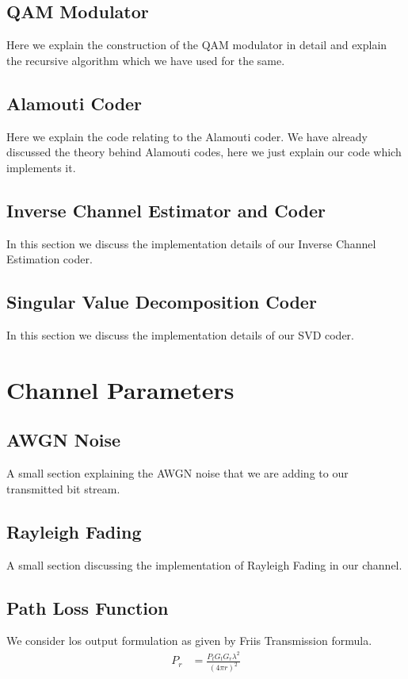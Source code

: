 \subsection{QAM Modulator}
Here we explain the construction of the QAM modulator in detail and explain the recursive algorithm which we have used for the same.

\subsection{Alamouti Coder}
Here we explain the code relating to the Alamouti coder. We have already discussed the theory behind Alamouti codes, here we just explain our code which implements it.


\subsection{Inverse Channel Estimator and Coder}
In this section we discuss the implementation details of our Inverse Channel Estimation coder.


\subsection{Singular Value Decomposition Coder}
In this section we discuss the implementation details of our SVD coder. 

\section{Channel Parameters}

\subsection{AWGN Noise}
A small section explaining the AWGN noise that we are adding to our transmitted bit stream.

\subsection{Rayleigh Fading}
A small section discussing the implementation of Rayleigh Fading in our channel.

\subsection{Path Loss Function}
We consider \acrshort{los} output formulation as given by Friis Transmission formula.
\begin{align*}
P_r &= \frac{P_t G_t G_r \lambda^2}{(4 \pi r)^2} 
\end{align*}

